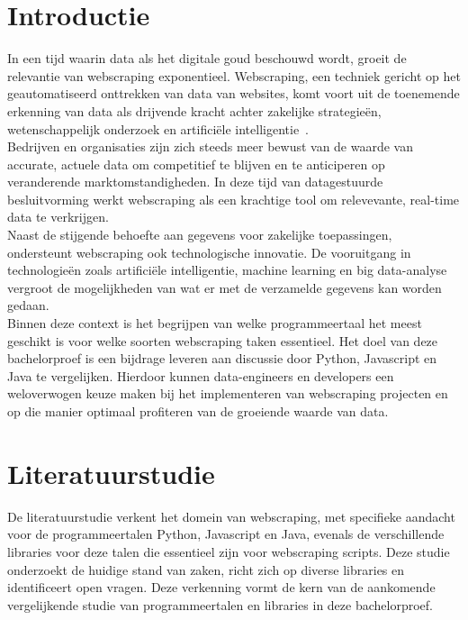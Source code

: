 
\section{Introductie}%
\label{sec:introductie}

In een tijd waarin data als het digitale goud beschouwd wordt, groeit de relevantie van webscraping exponentieel.
Webscraping, een techniek gericht op het geautomatiseerd onttrekken van data van websites, komt voort uit de toenemende 
erkenning van data als drijvende kracht achter zakelijke strategieën, wetenschappelijk onderzoek en artificiële intelligentie~\autocite{Oeztuerk2023}.
\\
Bedrijven en organisaties zijn zich steeds meer bewust van de waarde van accurate, actuele data om competitief te blijven
en te anticiperen op veranderende marktomstandigheden. In deze tijd van datagestuurde besluitvorming werkt webscraping als
een krachtige tool om relevevante, real-time data te verkrijgen.
\\
Naast de stijgende behoefte aan gegevens voor zakelijke toepassingen, ondersteunt webscraping ook technologische innovatie. 
De vooruitgang in technologieën zoals artificiële intelligentie, machine learning en big data-analyse vergroot de mogelijkheden
van wat er met de verzamelde gegevens kan worden gedaan.
\\
Binnen deze context is het begrijpen van welke programmeertaal het meest geschikt is voor welke soorten webscraping taken
essentieel. Het doel van deze bachelorproef is een bijdrage leveren aan discussie door Python, Javascript en Java te vergelijken.
Hierdoor kunnen data-engineers en developers een weloverwogen keuze maken bij het implementeren van webscraping projecten
en op die manier optimaal profiteren van de groeiende waarde van data.


\section{Literatuurstudie}
\label{sec:Literatuurstudie}

De literatuurstudie verkent het domein van webscraping, met specifieke aandacht voor de programmeertalen Python, Javascript en Java,
evenals de verschillende libraries voor deze talen die essentieel zijn voor webscraping scripts.
Deze studie onderzoekt de huidige stand van zaken, richt zich op diverse libraries en identificeert open vragen. 
Deze verkenning vormt de kern van de aankomende vergelijkende studie van programmeertalen en libraries in deze bachelorproef.

